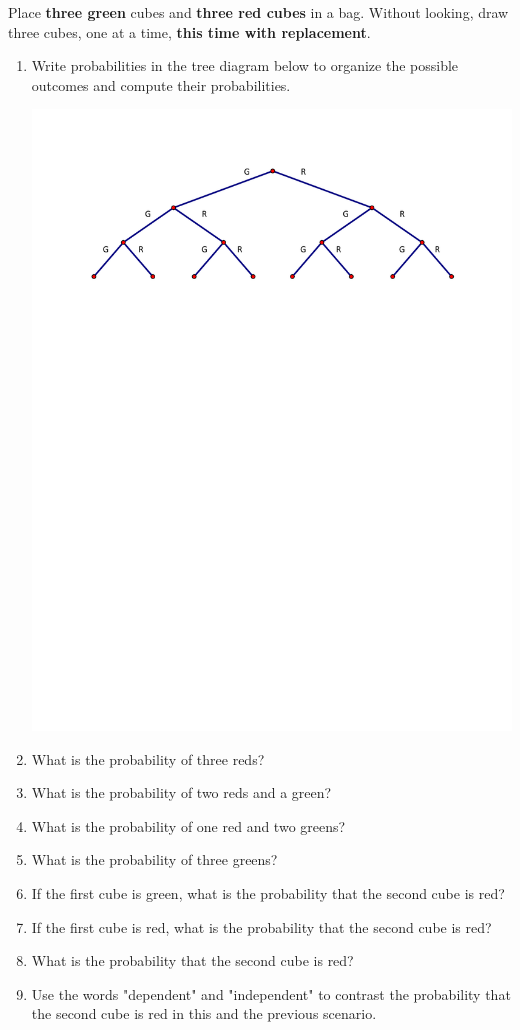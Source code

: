 \documentclass[nooutcomes]{ximera}
\begin{document}
\newpage
\begin{problem}
Place \textbf{three green} cubes and \textbf{three red cubes} in a bag.  Without looking, draw three cubes, one at a time, \textbf{this time with replacement}.  
\begin{enumerate}
\item Write probabilities in the tree diagram below to organize the possible outcomes and compute their probabilities.  
\begin{image}
\includegraphics[scale=0.8]{graphics/Tree.pdf}
\end{image}
\vspace{.15in}
\item What is the probability of three reds? 
\item What is the probability of two reds and a green? 
\item What is the probability of one red and two greens? 
\item What is the probability of three greens? 
\item If the first cube is green, what is the probability that the second cube is red? 
\item If the first cube is red, what is the probability that the second cube is red? 
\item What is the probability that the second cube is red?  
\item Use the words "dependent" and "independent" to contrast the probability that the second cube is red in this and the previous scenario.  
\end{enumerate}
\end{problem}
\end{document}
